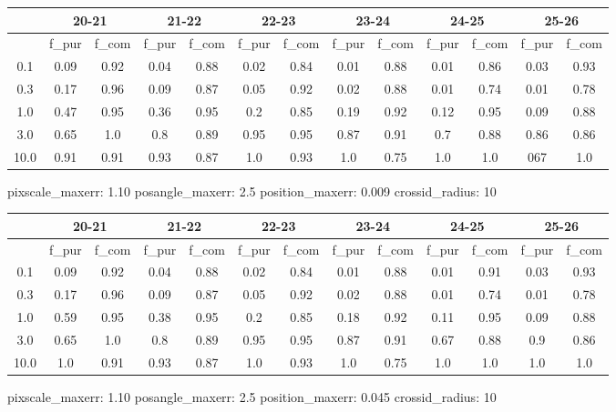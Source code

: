 \documentclass{article}
\begin{document}
\begin{figure}[H]
\centering
\begin{tabular}{|c|c|c|c|c|c|c|c|c|c|c|c|c|}
\hline
\multicolumn{1}{|c|}{} & \multicolumn{2}{|c|}{20-21} & \multicolumn{2}{|c|}{21-22} & \multicolumn{2}{|c|}{22-23} & \multicolumn{2}{|c|}{23-24} & \multicolumn{2}{|c|}{24-25} & \multicolumn{2}{|c|}{25-26}\\
\hline \hline
 & f\_pur & f\_com & f\_pur & f\_com & f\_pur & f\_com & f\_pur & f\_com & f\_pur & f\_com & f\_pur & f\_com \\
\hline
0.1 & 0.09 & 0.92 & 0.04 & 0.88 & 0.02 & 0.84 & 0.01 & 0.88 & 0.01 & 0.86 & 0.03 & 0.93\\
\hline
0.3 & 0.17 & 0.96 & 0.09 & 0.87 & 0.05 & 0.92 & 0.02 & 0.88 & 0.01 & 0.74 & 0.01 & 0.78\\
\hline
1.0 & 0.47 & 0.95 & 0.36 & 0.95 & 0.2 & 0.85 & 0.19 & 0.92 & 0.12 & 0.95 & 0.09 & 0.88\\
\hline
3.0 & 0.65 & 1.0 & 0.8 & 0.89 & 0.95 & 0.95 & 0.87 & 0.91 & 0.7 & 0.88 & 0.86 & 0.86\\
\hline
10.0 & 0.91 & 0.91 & 0.93 & 0.87 & 1.0 & 0.93 & 1.0 & 0.75 & 1.0 & 1.0 & 067 & 1.0\\
\hline
\end{tabular}
\caption{pixscale\_maxerr: 1.10 posangle\_maxerr: 2.5 position\_maxerr: 0.009 crossid\_radius: 10}
\end{figure}

\begin{figure}[H]
\centering
\begin{tabular}{|c|c|c|c|c|c|c|c|c|c|c|c|c|}
\hline
\multicolumn{1}{|c|}{} & \multicolumn{2}{|c|}{20-21} & \multicolumn{2}{|c|}{21-22} & \multicolumn{2}{|c|}{22-23} & \multicolumn{2}{|c|}{23-24} & \multicolumn{2}{|c|}{24-25} & \multicolumn{2}{|c|}{25-26}\\
\hline \hline
 & f\_pur & f\_com & f\_pur & f\_com & f\_pur & f\_com & f\_pur & f\_com & f\_pur & f\_com & f\_pur & f\_com \\
\hline
0.1 & 0.09 & 0.92 & 0.04 & 0.88 & 0.02 & 0.84 & 0.01 & 0.88 & 0.01 & 0.91 & 0.03 & 0.93\\
\hline
0.3 & 0.17 & 0.96 & 0.09 & 0.87 & 0.05 & 0.92 & 0.02 & 0.88 & 0.01 & 0.74 & 0.01 & 0.78\\
\hline
1.0 & 0.59 & 0.95 & 0.38 & 0.95 & 0.2 & 0.85 & 0.18 & 0.92 & 0.11 & 0.95 & 0.09 & 0.88\\
\hline
3.0 & 0.65 & 1.0 & 0.8 & 0.89 & 0.95 & 0.95 & 0.87 & 0.91 & 0.67 & 0.88 & 0.9 & 0.86\\
\hline
10.0 & 1.0 & 0.91 & 0.93 & 0.87 & 1.0 & 0.93 & 1.0 & 0.75 & 1.0 & 1.0 & 1.0 & 1.0\\
\hline
\end{tabular}
\caption{pixscale\_maxerr: 1.10 posangle\_maxerr: 2.5 position\_maxerr: 0.045 crossid\_radius: 10}
\end{figure}
\end{document}
